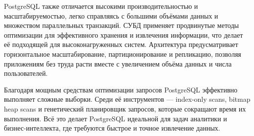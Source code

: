 PostgreSQL также отличается высокими производительностью и масштабируемостью, легко справляясь с большими объёмами данных и множеством параллельных транзакций. СУБД применяет продвинутые методы оптимизации для эффективного хранения и извлечения информации, что делает её подходящей для высоконагруженных систем. Архитектура предусматривает горизонтальное масштабирование, партиционирование и репликацию, позволяя приложениям без труда расти вместе с увеличением объёма данных и числа пользователей.

Благодаря мощным средствам оптимизации запросов PostgreSQL эффективно выполняет сложные выборки. Среди её инструментов — index-only scans, bitmap heap scans и генетический планировщик запросов, которые сокращают время их выполнения. Всё это делает PostgreSQL идеальной для задач аналитики и бизнес-интеллекта, где требуются быстрое и точное извлечение данных.

